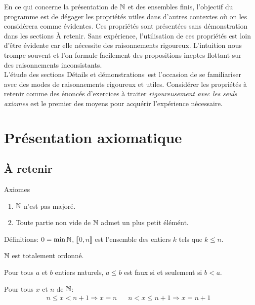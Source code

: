 
En ce qui concerne la présentation de $\mathbb{N}$ et des ensembles finis, l'objectif du programme est de dégager les propriétés utiles dans d'autres contextes où on les considérera comme \og évidentes\fg. Ces propriétés sont présentées sans démonstration dans les sections \og\`A retenir\fg.\newline
Sans expérience, l'utilisation de ces propriétés est loin d'être évidente car elle nécessite des raisonnements rigoureux. L'intuition nous trompe souvent et l'on formule facilement des propositions ineptes flottant sur des raisonnements inconsistants.\\
L'étude des sections \og Détails et démonstrations\fg \ est l'occasion de se familiariser avec des modes de raisonnements rigoureux et utiles. Considérer les propriétés à retenir comme des énoncés d'exercices à traiter \emph{rigoureusement avec les seuls axiomes} est le premier des moyens pour acquérir l'expérience nécessaire.
\section{Présentation axiomatique}
\subsection{\`A retenir}
Axiomes
\begin{enumerate}
 \item $\mathbb{N}$ n'est pas majoré.
 \item Toute partie non vide de $\mathbb{N}$ admet un plus petit élémént.
\end{enumerate}
 Définitions: $0=\min \mathbb{N}$, $\llbracket 0, n\rrbracket$ est l'ensemble des entiers $k$ tels que $k\leq n$.

\begin{propn}\label{pN: TotOrd}
 $\mathbb{N}$ est totalement ordonné.
\end{propn}

\begin{propn}\label{pN: cnsa<b}
 Pour tous $a$ et $b$ entiers naturels, $a\leq b$ est faux si et seulement si $b<a$.
\end{propn}

\begin{propn}\label{pN: Enc}
  Pour tous $x$ et $n$ de $\mathbb{N}$:
\begin{align*}
 n \leq x < n+1 \Rightarrow x=n & & n < x \leq n+1 \Rightarrow x = n+1
\end{align*}
\end{propn}

